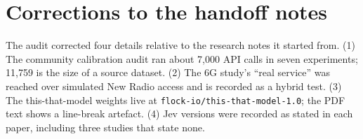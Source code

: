 \section{Corrections to the handoff notes}\label{sec:appendix-c-corrections-to-the-handoff-notes}

The audit corrected four details relative to the research notes it started from. (1) The community calibration audit ran about 7,000 API calls in seven experiments; 11,759 is the size of a source dataset. (2) The 6G study's “real service” was reached over simulated New Radio access and is recorded as a hybrid test. (3) The this-that-model weights live at \texttt{flock-io/this-that-model-1.0}; the PDF text shows a line-break artefact. (4) Jev versions were recorded as stated in each paper, including three studies that state none.
